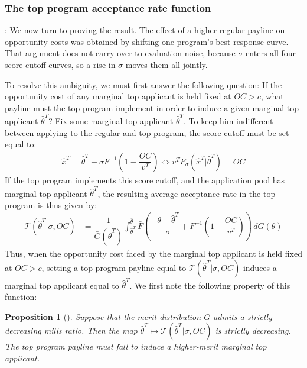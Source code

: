 \documentclass[12pt,reqno]{amsart}
\newtheorem{proposition}{Proposition}
\theoremstyle{definition}
\theoremstyle{plain} %
\begin{document}
\subsubsection{The top program acceptance rate function}: We now turn to proving the result. The effect of a higher regular payline on opportunity costs was obtained by shifting one program's best response curve. That argument does not carry over to evaluation noise, because $\sigma$ enters all four score cutoff curves, so a rise in $\sigma$ moves them all jointly. 

\noindent To resolve this ambiguity, we must first answer the following question: If the opportunity cost of any marginal top applicant is held fixed at $OC>c$, what payline must the top program implement in order to induce a given marginal top applicant $\hat{\theta}^T$? Fix some marginal top applicant $\hat{\theta}^T$. To keep him indifferent between applying to the regular and top program, the score cutoff must be set equal to:
\begin{align}\label{eq:fixedoc_topdemand}
  \hat{x}^T = \hat{\theta}^T + \sigma F^{-1}\left(1 - \dfrac{OC}{v^T}\right) \Longleftrightarrow v^T\bar{F}_{\sigma}(\hat{x}^T|\hat{\theta}^T) = OC
\end{align} 
If the top program implements this score cutoff, and the application pool has marginal top applicant $\hat{\theta}^T$, the resulting average acceptance rate in the top program is thus given by:
\begin{align*}
    \mathcal{T}(\hat{\theta}^T|\sigma, OC) &=  \dfrac{1}{\bar{G}(\hat{\theta}^T)}\int_{\hat{\theta}^T}^{\bar{\theta}}\bar{F}\left(-\dfrac{\theta-\hat{\theta}^T}{\sigma} + F^{-1}\left(1 - \dfrac{OC}{v^T}\right)\right) \,dG(\theta)
\end{align*} 
Thus, when the opportunity cost faced by the marginal top applicant is held fixed at $OC>c$, setting a top program payline equal to $\mathcal{T}(\hat{\theta}^T|\sigma, OC)$ induces a marginal top applicant equal to $\hat{\theta}^T$. We first note the following property of this function:

\begin{proposition}[\citet{adda2024grantmaking}]\label{prop:topacceptance_strictlydecreasig}
Suppose that the merit distribution $G$ admits a strictly decreasing mills ratio. Then the map $\hat{\theta}^T\mapsto \mathcal{T}(\hat{\theta}^T|\sigma, OC)$ is strictly decreasing. The top program payline must fall to induce a higher-merit marginal top applicant. 
\end{proposition}
\end{document}
